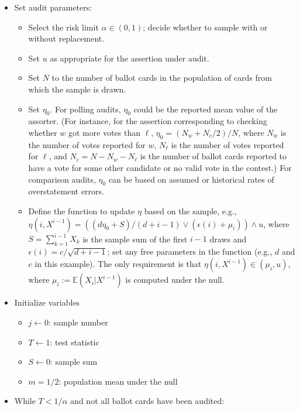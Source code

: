 \documentclass[aoas]{imsart}
\newcommand{\EE}{\mathbb{E}}
\begin{document}
\begin{itemize}
   \item Set audit parameters:
       \begin{itemize}
          \item Select the risk limit $\alpha \in (0, 1)$; decide whether to sample with or without replacement.
          \item Set $u$ as appropriate for the assertion under audit.
          \item Set $N$ to the number of ballot cards in the population of cards from which the sample is drawn.
          \item Set $\eta_0$. For polling audits, $\eta_0$ could be the reported mean value of the assorter. (For instance, for the assertion corresponding
          to checking whether $w$ got more votes than $\ell$,  $\eta_0 = (N_w + N_c/2)/N$, where $N_w$ is the number of
          votes reported for $w$, $N_\ell$ is the number of votes reported for $\ell$, and $N_c = N-N_w-N_\ell$ is the number
          of ballot cards reported to have a vote for some other candidate or no valid vote in the contest.)
          For comparison audits, $\eta_0$ can be based on assumed or historical rates of overstatement errors.
          \item Define the function to update $\eta$ based on the sample, e.g., \\
          $\eta(i, X^{i-1}) = \left ( (d\eta_0 + S)/(d+i-1) \vee (\epsilon(i)+ \mu_i) \right ) \wedge u$, where
          $S = \sum_{k=1}^{i-1}X_k$ is the sample sum of the first $i-1$ draws and $\epsilon(i) = c/\sqrt{d+i-1}$;
          set any free parameters in the function (e.g., $d$ and $c$ in this example).
          The only requirement is that $\eta(i, X^{i-1}) \in (\mu_i, u)$, where $\mu_i := \EE (X_i | X^{i-1})$ is computed under the null.
      \end{itemize}
    \item Initialize variables
        \begin{itemize}
          \item $j \leftarrow 0$: sample number
          \item $T \leftarrow 1$: test statistic
          \item $S \leftarrow 0$: sample sum
          \item $m = 1/2$: population mean under the null
      \end{itemize}
   \item While $T < 1/\alpha$ and not all ballot cards have been audited:

\end{itemize}
\end{document}
